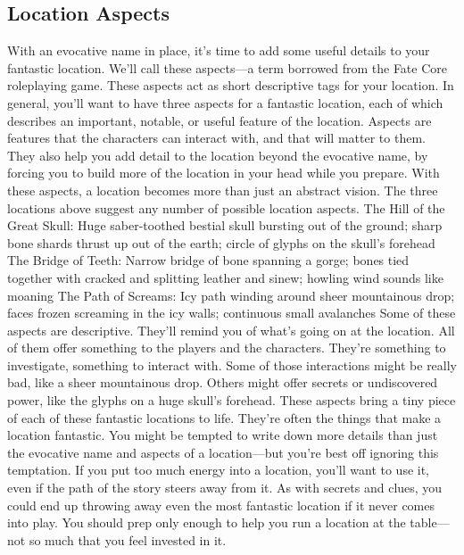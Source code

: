 \documentclass[10pt,a4paper,twoside,bg=print,twocolumn,openany,nodeprecatedcode]{dndbook}
\begin{document}
\subsection{Location Aspects}
With an evocative name in place, it's time to add some useful details to your fantastic location. We'll call these aspects—a term borrowed from the Fate Core roleplaying game. These aspects act as short descriptive tags for your location.
In general, you'll want to have three aspects for a fantastic location, each of which describes an important, notable, or useful feature of the location. Aspects are features that the characters can interact with, and that will matter to them. They also help you add detail to the location beyond the evocative name, by forcing you to build more of the location in your head while you prepare. With these aspects, a location becomes more than just an abstract vision.
The three locations above suggest any number of possible location aspects.
The Hill of the Great Skull: Huge saber-toothed bestial skull bursting out of the ground; sharp bone shards thrust up out of the earth; circle of glyphs on the skull's forehead
The Bridge of Teeth: Narrow bridge of bone spanning a gorge; bones tied together with cracked and splitting leather and sinew; howling wind sounds like moaning
The Path of Screams: Icy path winding around sheer mountainous drop; faces frozen screaming in the icy walls; continuous small avalanches
Some of these aspects are descriptive. They'll remind you of what's going on at the location. All of them offer something to the players and the characters. They're something to investigate, something to interact with. Some of those interactions might be really bad, like a sheer mountainous drop. Others might offer secrets or undiscovered power, like the glyphs on a huge skull's forehead. These aspects bring a tiny piece of each of these fantastic locations to life. They're often the things that make a location fantastic.
You might be tempted to write down more details than just the evocative name and aspects of a location—but you're best off ignoring this temptation. If you put too much energy into a location, you'll want to use it, even if the path of the story steers away from it. As with secrets and clues, you could end up throwing away even the most fantastic location if it never comes into play. You should prep only enough to help you run a location at the table—not so much that you feel invested in it.
\end{document}
